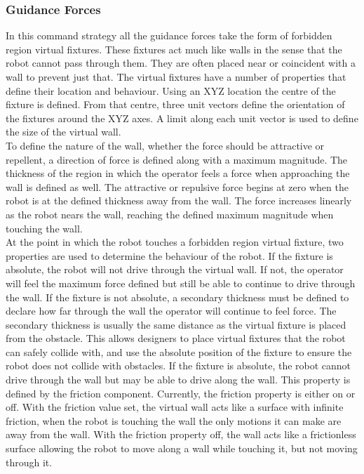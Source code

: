 \documentclass[onecolumn,10pt,final]{asme2ej}
\begin{document}
\subsubsection{Guidance Forces}

In this command strategy all the guidance forces take the form of forbidden region virtual fixtures. These fixtures act much like walls in the sense that the robot cannot pass through them. They are often placed near or coincident with a wall to prevent just that. The virtual fixtures have a number of properties that define their location and behaviour. Using an XYZ location the centre of the fixture is defined. From that centre, three unit vectors define the orientation of the fixtures around the XYZ axes. A limit along each unit vector is used to define the size of the virtual wall.\\

To define the nature of the wall, whether the force should be attractive or repellent, a direction of force is defined along with a maximum magnitude. The thickness of the region in which the operator feels a force when approaching the wall is defined as well. The attractive or repulsive force begins at zero when the robot is at the defined thickness away from the wall. The force increases linearly as the robot nears the wall, reaching the defined maximum magnitude when touching the wall.\\

At the point in which the robot touches a forbidden region virtual fixture, two properties are used to determine the behaviour of the robot. If the fixture is absolute, the robot will not drive through the virtual wall. If not, the operator will feel the maximum force defined but still be able to continue to drive through the wall. If the fixture is not absolute, a secondary thickness must be defined to declare how far through the wall the operator will continue to feel force. The secondary thickness is usually the same distance as the virtual fixture is placed from the obstacle. This allows designers to place virtual fixtures that the robot can safely collide with, and use the absolute position of the fixture to ensure the robot does not collide with obstacles. If the fixture is absolute, the robot cannot drive through the wall but may be able to drive along the wall. This property is defined by the friction component. Currently, the friction property is either on or off. With the friction value set, the virtual wall acts like a surface with infinite friction, when the robot is touching the wall the only motions it can make are away from the wall. With the friction property off, the wall acts like a frictionless surface allowing the robot to move along a wall while touching it, but not moving through it.\\
\end{document}
